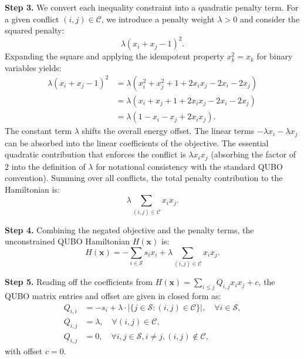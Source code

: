 \documentclass[12pt]{article}
\begin{document}
\textbf{Step 3.} We convert each inequality constraint into a quadratic penalty term. For a given conflict $(i,j) \in \mathcal{C}$, we introduce a penalty weight $\lambda > 0$ and consider the squared penalty:
\begin{equation}
  \lambda (x_i + x_j - 1)^2.
\end{equation}
Expanding the square and applying the idempotent property $x_k^2 = x_k$ for binary variables yields:
\begin{align}
  \lambda (x_i + x_j - 1)^2 &= \lambda (x_i^2 + x_j^2 + 1 + 2x_i x_j - 2x_i - 2x_j) \\
  &= \lambda (x_i + x_j + 1 + 2x_i x_j - 2x_i - 2x_j) \\
  &= \lambda (1 - x_i - x_j + 2x_i x_j).
\end{align}
The constant term $\lambda$ shifts the overall energy offset. The linear terms $-\lambda x_i - \lambda x_j$ can be absorbed into the linear coefficients of the objective. The essential quadratic contribution that enforces the conflict is $\lambda x_i x_j$ (absorbing the factor of $2$ into the definition of $\lambda$ for notational consistency with the standard QUBO convention). Summing over all conflicts, the total penalty contribution to the Hamiltonian is:
\begin{equation}
  \lambda \sum_{(i,j) \in \mathcal{C}} x_i x_j.
\end{equation}

\textbf{Step 4.} Combining the negated objective and the penalty terms, the unconstrained QUBO Hamiltonian $H(\mathbf{x})$ is:
\begin{equation}
  H(\mathbf{x}) = -\sum_{i \in \mathcal{S}} s_i x_i + \lambda \sum_{(i,j) \in \mathcal{C}} x_i x_j.
\end{equation}

\textbf{Step 5.} Reading off the coefficients from $H(\mathbf{x}) = \sum_{i \le j} Q_{i,j} x_i x_j + c$, the QUBO matrix entries and offset are given in closed form as:
\begin{align}
  Q_{i,i} &= -s_i + \lambda \cdot |\{j \in \mathcal{S} : (i,j) \in \mathcal{C}\}|, \quad \forall i \in \mathcal{S}, \\
  Q_{i,j} &= \lambda, \quad \forall (i,j) \in \mathcal{C}, \\
  Q_{i,j} &= 0, \quad \forall i,j \in \mathcal{S}, i \neq j, (i,j) \notin \mathcal{C},
\end{align}
with offset $c = 0$.
\end{document}
